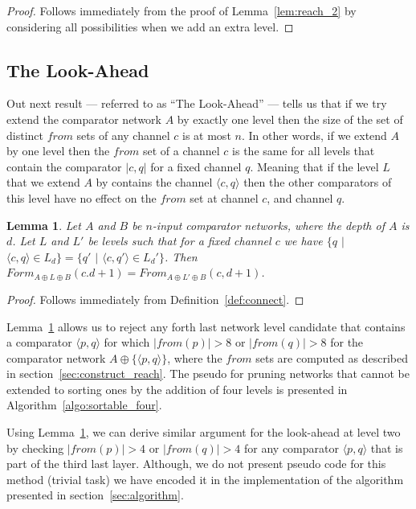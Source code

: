 \documentclass[13pt,a4paper]{article}
\newtheorem{lemma}[theorem]{Lemma}
\begin{document}
\begin{proof}
Follows immediately from the proof of Lemma~\ref{lem:reach_2} by considering all possibilities when we add an extra level.
\end{proof}



\subsection{The Look-Ahead}

Out next result --- referred to as ``The Look-Ahead'' --- tells us that if we try extend the comparator network $A$ by exactly one level then the size of the set of distinct $from$ sets of any channel $c$ is at most $n$. In other words, if we extend $A$ by one level then the $from$ set of a channel $c$ is the same for all levels that contain the comparator $\lvert c, q \rvert$ for a fixed channel $q$. Meaning that if the level $L$ that we extend $A$ by contains the channel $\langle c, q \rangle$ then the other comparators of this level have no effect on the $from$ set at channel $c$, and channel $q$.

\begin{lemma}
\label{lem:look_ahead}
Let $A$ and $B$ be $n$-input comparator networks, where the depth of $A$ is $d$. Let $L$ and $L'$ be levels such that for a fixed channel $c$ we have $\{ q$ $\lvert$ $\langle c, q \rangle \in L_d \} = \{ q'$ $\lvert$ $\langle c, q' \rangle \in {L_d}' \}$. Then $Form_{A \oplus L \oplus B}(c. d+1) = From_{A \oplus L' \oplus B}(c, d+1)$.
\end{lemma}

\begin{proof}
Follows immediately from Definition~\ref{def:connect}. 
\end{proof}

Lemma~\ref{lem:look_ahead} allows us to reject any forth last network level candidate that contains a comparator $\langle p, q \rangle$ for which $| from(p) | > 8$ or $| from(q) | > 8$ for the comparator network $A \oplus \{ \langle p,q \rangle \}$, where the $from$ sets are computed as described in section~\ref{sec:construct_reach}. The pseudo for pruning networks that cannot be extended to sorting ones by the addition of four levels is presented in Algorithm~\ref{algo:sortable_four}.

Using Lemma~\ref{lem:look_ahead}, we can derive similar argument for the look-ahead at level two by checking $| from(p) | > 4$ or $| from(q) | > 4$ for any comparator $\langle p,q \rangle$ that is part of the third last layer. Although, we do not present pseudo code for this method (trivial task) we have encoded it in the implementation of the algorithm presented in section~\ref{sec:algorithm}.
\end{document}
